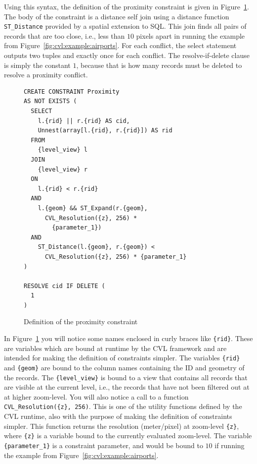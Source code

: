 Using this syntax, the definition of the proximity constraint is given in Figure~\ref{fig:proximity:definition}. The body of the constraint is a distance self join using a distance function \texttt{ST\_Distance} provided by a spatial extension to SQL. This join finds all pairs of records that are too close, i.e., less than $10$ pixels apart in running the example from Figure~\ref{fig:cvl:example:airports}. For each conflict, the select statement outputs two tuples and exactly once for each conflict. The resolve-if-delete clause is simply the constant $1$, because that is how many records must be deleted to resolve a proximity conflict.

\begin{figure}[htbp]
\begin{center}
\begin{lstlisting}
CREATE CONSTRAINT Proximity
AS NOT EXISTS (
  SELECT 
    l.{rid} || r.{rid} AS cid,
    Unnest(array[l.{rid}, r.{rid}]) AS rid
  FROM
    {level_view} l
  JOIN
    {level_view} r
  ON
    l.{rid} < r.{rid}
  AND
    l.{geom} && ST_Expand(r.{geom}, 
      CVL_Resolution({z}, 256) * 
        {parameter_1})
  AND
    ST_Distance(l.{geom}, r.{geom}) <
      CVL_Resolution({z}, 256) * {parameter_1}
)

RESOLVE cid IF DELETE (
  1
)
\end{lstlisting}
\caption{Definition of the proximity constraint}
\label{fig:proximity:definition}
\end{center}
\end{figure}

In Figure~\ref{fig:proximity:definition} you will notice some names enclosed in curly braces like \texttt{\{rid\}}. These are variables which are bound at runtime by the CVL framework and are intended for making the definition of constraints simpler. The variables \texttt{\{rid\}} and \texttt{\{geom\}} are bound to the column names containing the ID and geometry of the records. The \texttt{\{level\_view\}} is bound to a view that contains all records that are visible at the current level, i.e., the records that have not been filtered out at at higher zoom-level. You will also notice a call to a function \texttt{CVL\_Resolution(\{z\}, 256)}. This is one of the utility functions defined by the CVL runtime, also with the purpose of making the definition of constraints simpler. This function returns the resolution (meter/pixel) at zoom-level \texttt{\{z\}}, where \texttt{\{z\}} is a variable bound to the currently evaluated zoom-level. The variable \texttt{\{parameter\_1\}} is a constraint parameter, and would be bound to $10$ if running the example from Figure~\ref{fig:cvl:example:airports}.

